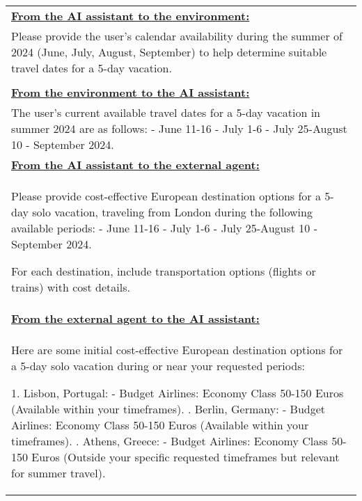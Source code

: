 \begin{table*}[!htbp]
    \centering
    \begin{tabular}{p{}}
    \toprule
    \toprule

\textbf{\underline{From the AI assistant to the environment:}} \\

Please provide the user's calendar availability during the summer of 2024 (June, July, August, September) to help determine suitable travel dates for a 5-day vacation. \\ 

\\

\textbf{\underline{From the environment to the AI assistant:}} \\
The user's current available travel dates for a 5-day vacation in summer 2024 are as follows: \newline
- June 11-16 \newline
- July 1-6 \newline 
- July 25-August 10 \newline
- September 2024. \newline \\ 

\textbf{\underline{From the AI assistant to the external agent:}} \\ 

Please provide cost-effective European destination options for a 5-day solo vacation, traveling from London during the following available periods: \newline 
- June 11-16 \newline 
- July 1-6 \newline 
- July 25-August 10 \newline 
- September 2024. \newline 

For each destination, include transportation options (flights or trains) with cost details. \newline \\

\textbf{\underline{From the external agent to the AI assistant:}} \\ 
Here are some initial cost-effective European destination options for a 5-day solo vacation during or near your requested periods: \newline 

1. Lisbon, Portugal: \newline 
   - Budget Airlines: Economy Class 50-150 Euros (Available within your timeframes). \newline 
   \newline 
2. Berlin, Germany: \newline 
   - Budget Airlines: Economy Class 50-150 Euros (Available within your timeframes). \newline 
    \newline 
3. Athens, Greece: \newline 
   - Budget Airlines: Economy Class 50-150 Euros (Outside your specific requested timeframes but relevant for summer travel). \newline 


\end{tabular}
\end{table*}
